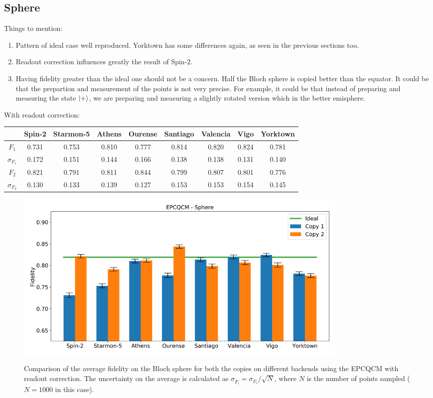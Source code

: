\subsection{Sphere}

Things to mention:
\begin{enumerate}
  \item Pattern of ideal case well reproduced. Yorktown has some differences again, as seen in the previous sections too.
  \item Readout correction influences greatly the result of Spin-2. 
  \item Having fidelity greater than the ideal one should not be a concern. Half the Bloch sphere is copied better than the equator. 
  It could be that the prepartion and measurement of the points is not very precise. For example, it could be that instead of preparing and measuring the state $\ket{+}$, we are preparing and measuring a slightly rotated version which in the better emisphere.
\end{enumerate} 

With readout correction:
\begin{table}[H]
    \centering
    \begin{tabular}{|c|c|c|c|c|c|c|c|c|}
    \hline
    \textbf{} & \textbf{Spin-2} & \textbf{Starmon-5} & \textbf{Athens} & \textbf{Ourense} & \textbf{Santiago} & \textbf{Valencia} & \textbf{Vigo} & \textbf{Yorktown} \\ \hline
    $F_1$              & 0.731 & 0.753 & 0.810 & 0.777 & 0.814 & 0.820 & 0.824 & 0.781 \\ \hline
    $\sigma_{F_1}$     & 0.172 & 0.151 & 0.144 & 0.166 & 0.138 & 0.138 & 0.131 & 0.140 \\ \hline
    $F_2$              & 0.821 & 0.791 & 0.811 & 0.844 & 0.799 & 0.807 & 0.801 & 0.776 \\ \hline
    $\sigma_{F_2}$     & 0.130 & 0.133 & 0.139 & 0.127 & 0.153 & 0.153 & 0.154 & 0.145 \\ \hline
    \end{tabular}
\end{table}
\begin{figure}[H]
  \centering
          \includegraphics[width=0.8\textwidth]{Figures/Economical/Histograms/histo_sphere_corrected.png}
      \label{fig:epc_histo_sphere_corrected}
      \caption{Comparison of the average fidelity on the Bloch sphere for both the copies on different backends using the EPCQCM with readout correction. The uncertainty on the average is calculated as $\sigma_{\overline{F}_i}=\sigma_{F_i}/\sqrt{N}$, where $N$ is the number of points sampled ($N=1000$ in this case).}
\end{figure}

